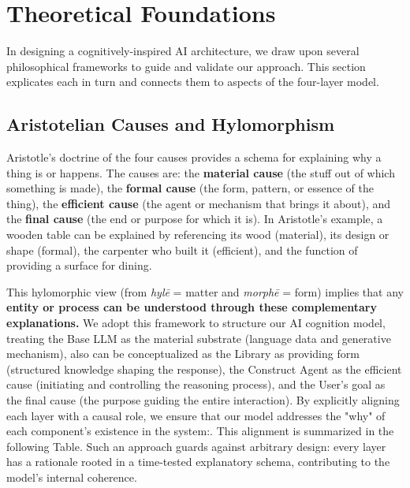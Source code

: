 \documentclass{article}
\begin{document}
\hrulefill{}

\section{Theoretical Foundations}\label{sec:foundations}
In designing a cognitively-inspired AI architecture, we draw upon several philosophical frameworks to guide and validate our approach. This section explicates each in turn and connects them to aspects of the four-layer model.

\subsection{Aristotelian Causes and Hylomorphism}
Aristotle's doctrine of the four causes provides a schema for explaining why a thing is or happens. The causes are: the \textbf{material cause} (the stuff out of which something is made), the \textbf{formal cause} (the form, pattern, or essence of the thing), the \textbf{efficient cause} (the agent or mechanism that brings it about), and the \textbf{final cause} (the end or purpose for which it is). In Aristotle's example, a wooden table can be explained by referencing its wood (material), its design or shape (formal), the carpenter who built it (efficient), and the function of providing a surface for dining. 

This hylomorphic view (from \emph{hylē} = matter and \emph{morphē} = form) implies that any \textbf{entity or process can be understood through these complementary explanations.} We adopt this framework to structure our AI cognition model, treating the Base LLM as the material substrate (language data and generative mechanism), also can be conceptualized as the Library as providing form (structured knowledge shaping the response), the Construct Agent as the efficient cause (initiating and controlling the reasoning process), and the User's goal as the final cause (the purpose guiding the entire interaction). By explicitly aligning each layer with a causal role, we ensure that our model addresses the "why" of each component's existence in the system:. This alignment is summarized in the following Table. Such an approach guards against arbitrary design: every layer has a rationale rooted in a time-tested explanatory schema, contributing to the model's internal coherence.
\end{document}
